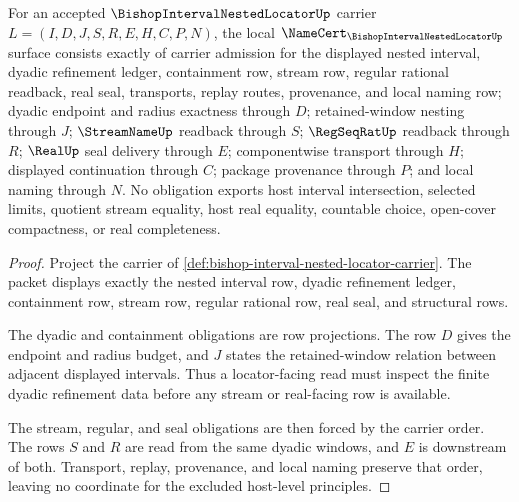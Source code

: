 \begin{theorem}
\label{thm:bishop-interval-nested-locator-namecert-obligations}
For an accepted $\BishopIntervalNestedLocatorUp$ carrier $L=(I,D,J,S,R,E,H,C,P,N)$, the local $\NameCert_{\BishopIntervalNestedLocatorUp}$ surface consists exactly of carrier admission for the displayed nested interval, dyadic refinement ledger, containment row, stream row, regular rational readback, real seal, transports, replay routes, provenance, and local naming row; dyadic endpoint and radius exactness through $D$; retained-window nesting through $J$; $\StreamNameUp$ readback through $S$; $\RegSeqRatUp$ readback through $R$; $\RealUp$ seal delivery through $E$; componentwise transport through $H$; displayed continuation through $C$; package provenance through $P$; and local naming through $N$. No obligation exports host interval intersection, selected limits, quotient stream equality, host real equality, countable choice, open-cover compactness, or real completeness.
\end{theorem}
\begin{proof}
Project the carrier of \autoref{def:bishop-interval-nested-locator-carrier}. The packet displays exactly the nested interval row, dyadic refinement ledger, containment row, stream row, regular rational row, real seal, and structural rows.

The dyadic and containment obligations are row projections. The row $D$ gives the endpoint and radius budget, and $J$ states the retained-window relation between adjacent displayed intervals. Thus a locator-facing read must inspect the finite dyadic refinement data before any stream or real-facing row is available.

The stream, regular, and seal obligations are then forced by the carrier order. The rows $S$ and $R$ are read from the same dyadic windows, and $E$ is downstream of both. Transport, replay, provenance, and local naming preserve that order, leaving no coordinate for the excluded host-level principles.
\end{proof}

